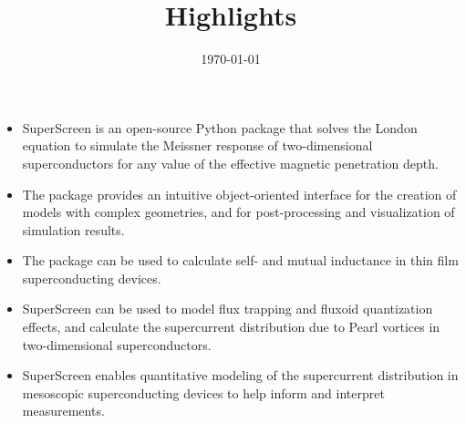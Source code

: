 \documentclass{article} %
\title{Highlights}
\date{\today}
\begin{document}
\maketitle
\begin{itemize}
    \item{SuperScreen is an open-source Python package that solves the London equation to simulate the Meissner response of two-dimensional superconductors for any value of the effective magnetic penetration depth.}
    \item{The package provides an intuitive object-oriented interface for the creation of models with complex geometries, and for post-processing and visualization of simulation results.}
    \item{The package can be used to calculate self- and mutual inductance in thin film superconducting devices.}
    \item{SuperScreen can be used to model flux trapping and fluxoid quantization effects, and calculate the supercurrent distribution due to Pearl vortices in two-dimensional superconductors.}
    \item{SuperScreen enables quantitative modeling of the supercurrent distribution in mesoscopic superconducting devices to help inform and interpret measurements.}
\end{itemize}
\end{document}
